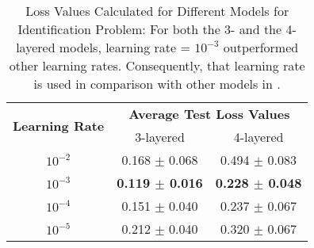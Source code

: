 \begin{table}[!htbp]
    \centering
    \caption[Loss Values Calculated for Different Models for Identification Problem]{Loss Values Calculated for Different Models for Identification Problem: For both the 3- and the 4-layered models, learning rate = $10^{-3}$ outperformed other learning rates. Consequently, that learning rate is used in comparison with other models in .}
    \label{tab:Loss Values Calculated for Different Models for Identification Problem}
    \begin{tabular}{c | c | c}
        \hline
        \multirow{2}{*}{\textbf{Learning Rate}} & \multicolumn{2}{c}{\textbf{Average Test Loss Values}} \\
        & 3-layered & 4-layered\\
        \hline
        $10^{-2}$ & 0.168 $\pm$ 0.068 & 0.494 $\pm$ 0.083\\
        $10^{-3}$ & \textbf{0.119 $\pm$ 0.016} & \textbf{0.228 $\pm$ 0.048}\\
        $10^{-4}$ & 0.151 $\pm$ 0.040 & 0.237 $\pm$ 0.067\\
        $10^{-5}$ & 0.212 $\pm$ 0.040 & 0.320 $\pm$ 0.067\\
        \hline
    \end{tabular}
\end{table}

